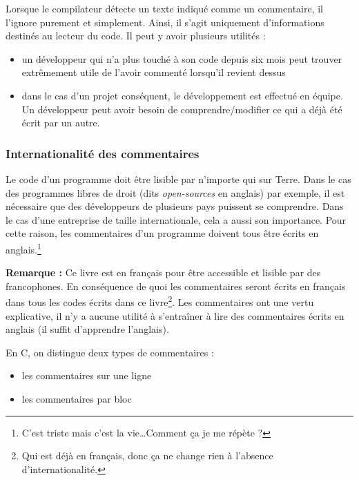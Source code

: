 \documentclass[../../../main.tex]{subfiles}
\begin{document}
Lorsque le compilateur détecte un texte indiqué comme un commentaire, il l'ignore purement et simplement. Ainsi, il s'agit uniquement d'informations destinés au lecteur du code. Il peut y avoir plusieurs utilités :
\begin{itemize}
	\item un développeur qui n'a plus touché à son code depuis six mois peut trouver extrêmement utile de l'avoir commenté lorsqu'il revient dessus
	\item dans le cas d'un projet conséquent, le développement est effectué en équipe. Un développeur peut avoir besoin de comprendre/modifier ce qui a déjà été écrit par un autre.
\end{itemize}
\subsubsection{Internationalité des commentaires}
 
Le code d'un programme doit être lisible par n'importe qui sur Terre. Dans le cas des programmes libres de droit (dits \textit{open-sources} en anglais) par exemple, il est nécessaire que des développeurs de plusieurs pays puissent se comprendre. Dans le cas d'une entreprise de taille internationale, cela a aussi son importance. Pour cette raison, les commentaires d'un programme doivent tous être écrits en anglais.\footnote{C'est triste mais c'est la vie\dots Comment ça je me répète ?}

\textbf{Remarque :} Ce livre est en français pour être accessible et lisible par des francophones. En conséquence de quoi les commentaires seront écrits en français dans tous les codes écrits dans ce livre\footnote{Qui est déjà en français, donc ça ne change rien à l'absence d'internationalité.}. Les commentaires ont une vertu explicative, il n'y a aucune utilité à s'entraîner à lire des commentaires écrits en anglais (il suffit d'apprendre l'anglais).

En C, on distingue deux types de commentaires :
\begin{itemize}
	\item les commentaires sur une ligne
	\item les commentaires par bloc
\end{itemize}
\end{document}
